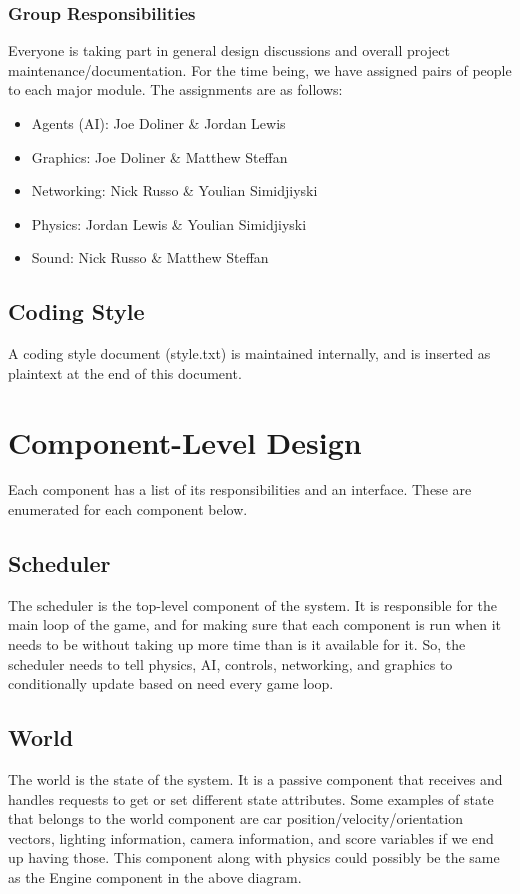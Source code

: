 \documentclass[12pt]{article}
\begin{document}
\subsubsection{Group Responsibilities}
Everyone is taking part in general design discussions and overall project maintenance/documentation.  For the time being, we have assigned pairs of people to each major module.  The assignments are as follows:
\begin{itemize}
\item Agents (AI):  Joe Doliner \& Jordan Lewis
\item Graphics:  Joe Doliner \& Matthew Steffan
\item Networking:  Nick Russo \& Youlian Simidjiyski 
\item Physics:  Jordan Lewis \& Youlian Simidjiyski
\item Sound:  Nick Russo \& Matthew Steffan
\end{itemize}
\subsection{Coding Style} A coding style document (style.txt) is maintained internally, and is inserted as plaintext at the end of this document.

\section{Component-Level Design}
Each component has a list of its responsibilities and an interface. These are
enumerated for each component below.
\subsection{Scheduler}
The scheduler is the top-level component of the system. It is responsible for
the main loop of the game, and for making sure that each component is run
when it needs to be without taking up more time than is it available for it.
So, the scheduler needs to tell physics, AI, controls, networking, and graphics
to conditionally update based on need every game loop.
\subsection{World}
The world is the state of the system. It is a passive component that receives
and handles requests to get or set different state attributes. Some examples
of state that belongs to the world component are car
position/velocity/orientation vectors, lighting information, camera information,
and score variables if we end up having those. This component along with physics
could possibly be the same as the Engine component in the above diagram.
\end{document}
